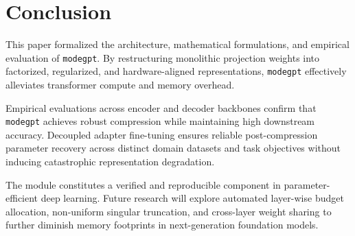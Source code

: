 \section{Conclusion}
This paper formalized the architecture, mathematical formulations, and empirical evaluation of \texttt{modegpt}. By restructuring monolithic projection weights into factorized, regularized, and hardware-aligned representations, \texttt{modegpt} effectively alleviates transformer compute and memory overhead.

Empirical evaluations across encoder and decoder backbones confirm that \texttt{modegpt} achieves robust compression while maintaining high downstream accuracy. Decoupled adapter fine-tuning ensures reliable post-compression parameter recovery across distinct domain datasets and task objectives without inducing catastrophic representation degradation.

The module constitutes a verified and reproducible component in parameter-efficient deep learning. Future research will explore automated layer-wise budget allocation, non-uniform singular truncation, and cross-layer weight sharing to further diminish memory footprints in next-generation foundation models.
